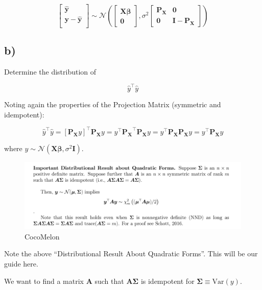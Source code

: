 \documentclass[
]{article}
\begin{document}
\[
\begin{bmatrix}
\boldsymbol{\hat{y}} \\ 
\boldsymbol{y - \hat{y}} \\ 
\end{bmatrix}
\sim
\mathcal{N} \left( 
\begin{bmatrix} \boldsymbol{X} \boldsymbol{\beta} \\ \boldsymbol{0} \end{bmatrix}, 
\sigma^2 
\begin{bmatrix} 
\boldsymbol{P_X} & \boldsymbol{0} \\ \boldsymbol{0} & \boldsymbol{I} - \boldsymbol{P_X} 
\end{bmatrix}
\right)
\]

\newpage

\subsection{b)}\label{b}

Determine the distribution of

\[
\hat{y}^{\top} \hat{y}
\]

Noting again the properties of the Projection Matrix (symmetric and
idempotent):

\[
\hat{y}^{\top} \hat{y} = [\boldsymbol{P_X} y]^{\top} \boldsymbol{P_X} y = y^{\top} \boldsymbol{P_X}^{\top} \boldsymbol{P_X} y = y^{\top} \boldsymbol{P_X} \boldsymbol{P_X} y
= y^{\top} \boldsymbol{P_X} y
\]

where
\(y \sim \mathcal{N}(\boldsymbol{X} \boldsymbol{\beta}, \sigma^2 \boldsymbol{I})\).

\begin{figure}
\includegraphics[width=14.39in]{Form} \caption{CocoMelon}\label{fig:unnamed-chunk-3}
\end{figure}

Note the above ``Distributional Result About Quadratic Forms''. This
will be our guide here.

We want to find a matrix \(\boldsymbol{A}\) such that
\(\boldsymbol{A} \boldsymbol{\Sigma}\) is idempotent for
\(\boldsymbol{\Sigma} \equiv \text{Var}(y)\).
\end{document}
